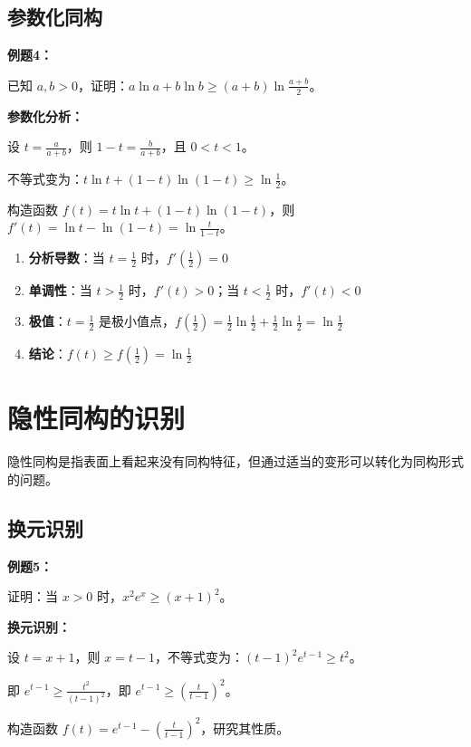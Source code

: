 \documentclass[a4paper,11pt]{ctexrep}
\newcommand{\exampleicon}{\ModeBadge[highlight]{例题}}
\newcommand{\analysisicon}{\ModeBadge[secondary]{分析}}
\theoremstyle{definition}
\begin{document}
\subsection{参数化同构}

\exampleicon \textbf{例题4：}

已知 $a, b > 0$，证明：$a\ln a + b\ln b \geq (a+b)\ln\frac{a+b}{2}$。

\analysisicon \textbf{参数化分析：}

设 $t = \frac{a}{a+b}$，则 $1-t = \frac{b}{a+b}$，且 $0 < t < 1$。

不等式变为：$t\ln t + (1-t)\ln(1-t) \geq \ln\frac{1}{2}$。

构造函数 $f(t) = t\ln t + (1-t)\ln(1-t)$，则 $f'(t) = \ln t - \ln(1-t) = \ln\frac{t}{1-t}$。

\begin{enumerate}
    \item \textbf{分析导数}：当 $t = \frac{1}{2}$ 时，$f'(\frac{1}{2}) = 0$
    \item \textbf{单调性}：当 $t > \frac{1}{2}$ 时，$f'(t) > 0$；当 $t < \frac{1}{2}$ 时，$f'(t) < 0$
    \item \textbf{极值}：$t = \frac{1}{2}$ 是极小值点，$f(\frac{1}{2}) = \frac{1}{2}\ln\frac{1}{2} + \frac{1}{2}\ln\frac{1}{2} = \ln\frac{1}{2}$
    \item \textbf{结论}：$f(t) \geq f(\frac{1}{2}) = \ln\frac{1}{2}$
\end{enumerate}

\section{隐性同构的识别}

隐性同构是指表面上看起来没有同构特征，但通过适当的变形可以转化为同构形式的问题。

\subsection{换元识别}

\exampleicon \textbf{例题5：}

证明：当 $x > 0$ 时，$x^2e^x \geq (x+1)^2$。

\analysisicon \textbf{换元识别：}

设 $t = x + 1$，则 $x = t - 1$，不等式变为：$(t-1)^2e^{t-1} \geq t^2$。

即 $e^{t-1} \geq \frac{t^2}{(t-1)^2}$，即 $e^{t-1} \geq \left(\frac{t}{t-1}\right)^2$。

构造函数 $f(t) = e^{t-1} - \left(\frac{t}{t-1}\right)^2$，研究其性质。
\end{document}
